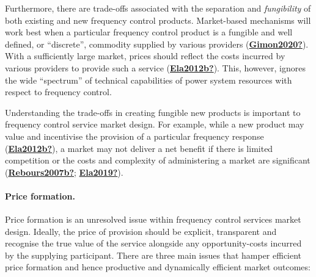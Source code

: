 \documentclass[12pt,a4paper,]{report}
\begin{document}
Furthermore, there are trade-offs associated with the separation and
\emph{fungibility} of both existing and new frequency control products.
Market-based mechanisms will work best when a particular frequency
control product is a fungible and well defined, or ``discrete'',
commodity supplied by various providers
(\protect\hyperlink{ref-Gimon2020}{\textbf{Gimon2020?}}). With a
sufficiently large market, prices should reflect the costs incurred by
various providers to provide such a service
(\protect\hyperlink{ref-Ela2012b}{\textbf{Ela2012b?}}). This, however,
ignores the wide ``spectrum'' of technical capabilities of power system
resources with respect to frequency control.

Understanding the trade-offs in creating fungible new products is
important to frequency control service market design. For example, while
a new product may value and incentivise the provision of a particular
frequency response
(\protect\hyperlink{ref-Ela2012b}{\textbf{Ela2012b?}}), a market may not
deliver a net benefit if there is limited competition or the costs and
complexity of administering a market are significant
(\protect\hyperlink{ref-Rebours2007b}{\textbf{Rebours2007b?}};
\protect\hyperlink{ref-Ela2019}{\textbf{Ela2019?}}).

\hypertarget{price-formation.}{%
\paragraph{Price formation.}\label{price-formation.}}

Price formation is an unresolved issue within frequency control services
market design. Ideally, the price of provision should be explicit,
transparent and recognise the true value of the service alongside any
opportunity-costs incurred by the supplying participant. There are three
main issues that hamper efficient price formation and hence productive
and dynamically efficient market outcomes:
\end{document}
